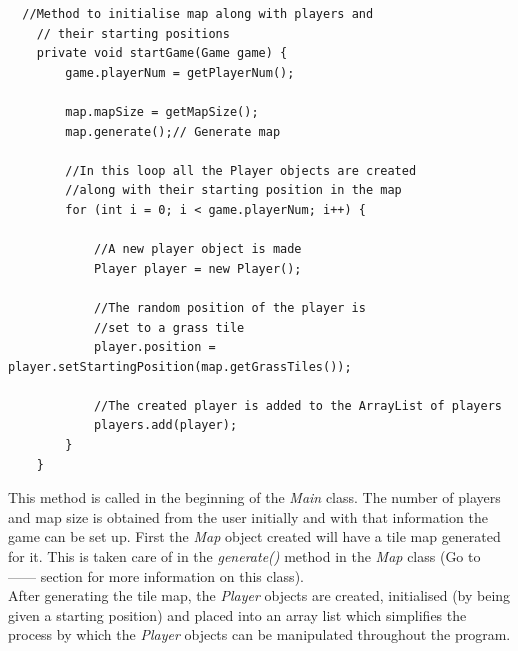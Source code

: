 \documentclass[a4paper,12pt]{extarticle}
\begin{document}
\newpage
\begin{lstlisting}
  //Method to initialise map along with players and
    // their starting positions
    private void startGame(Game game) {
        game.playerNum = getPlayerNum();

        map.mapSize = getMapSize();
        map.generate();// Generate map

        //In this loop all the Player objects are created 
        //along with their starting position in the map
        for (int i = 0; i < game.playerNum; i++) {

            //A new player object is made
            Player player = new Player();

            //The random position of the player is 
            //set to a grass tile
            player.position = player.setStartingPosition(map.getGrassTiles());

            //The created player is added to the ArrayList of players
            players.add(player);
        }
    }
\end{lstlisting}
\vspace{4mm}

\noindent This method is called in the beginning of the \textit{Main} class. The number of players and map size is obtained from the user initially and with that information the game can be set up. First the \textit{Map} object created will have a tile map generated for it. This is taken care of in the \textit{generate()} method in the \textit{Map} class (Go to ------ section for more information on this class).\\

\noindent After generating the tile map, the \textit{Player} objects are created, initialised (by being given a starting position) and placed into an array list which simplifies the process by which the \textit{Player} objects can be manipulated throughout the program.\\
\end{document}
